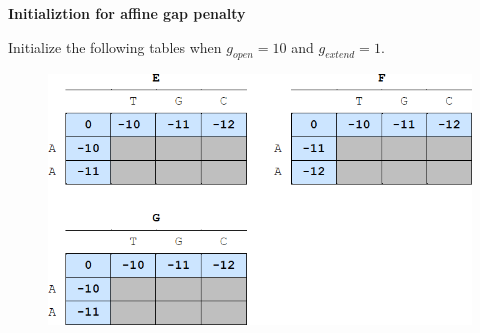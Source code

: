 \question \textbf{Initializtion for affine gap penalty}
  
Initialize the following tables when $g_{open} = 10$ and $g_{extend} = 1$.

\vspace{0.1 in}

\begin{figure}[h]
  \centering
      \includegraphics[width=0.7 \textwidth]{fig03/affine_dp_initialize_solution.png}
\end{figure}

  \vspace{0.1 in}
